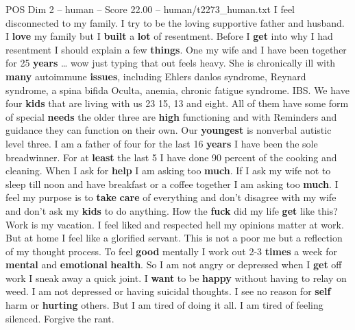 \begin{textsample}{POS Dim 2 – human – Score 22.00 – human/t2273\_human.txt}  \label{ex:f2_pos_030}
I feel disconnected to my family.
I try to be the loving supportive father and husband.
I \textbf{love} my family but I \textbf{built} a \textbf{lot} of resentment.
Before I \textbf{get} into why I had resentment I should explain a few \textbf{things}.
One my wife and I have been together for 25 \textbf{years} … wow just typing that out feels heavy.
She is chronically ill with \textbf{many} autoimmune \textbf{issues}, including Ehlers danlos syndrome, Reynard syndrome, a spina bifida Oculta, anemia, chronic fatigue syndrome.
IBS.
We have four \textbf{kids} that are living with us 23 15, 13 and eight.
All of them have some form of special \textbf{needs} the older three are \textbf{high} functioning and with Reminders and guidance they can function on their own.
Our \textbf{youngest} is nonverbal autistic level three.
I am a father of four for the last 16 \textbf{years} I have been the sole breadwinner.
For at \textbf{least} the last 5 I have done 90 percent of the cooking and cleaning.
When I ask for \textbf{help} I am asking too \textbf{much}.
If I ask my wife not to sleep till noon and have breakfast or a coffee together I am asking too \textbf{much}.
I feel my purpose is to \textbf{take} \textbf{care} of everything and don't disagree with my wife and don't ask my \textbf{kids} to do anything.
How the \textbf{fuck} did my life \textbf{get} like this?
Work is my vacation.
I feel liked and respected hell my opinions matter at work.
But at home I feel like a glorified servant.
This is not a poor me but a reflection of my thought process.
To feel \textbf{good} mentally I work out 2-3 \textbf{times} a week for \textbf{mental} and \textbf{emotional} \textbf{health}.
So I am not angry or depressed when I \textbf{get} off work I sneak away a quick joint.
I \textbf{want} to be \textbf{happy} without having to relay on weed.
I am not depressed or having suicidal thoughts.
I see no reason for \textbf{self} harm or \textbf{hurting} others.
But I am tired of doing it all.
I am tired of feeling silenced.
Forgive the rant.

\end{textsample}
